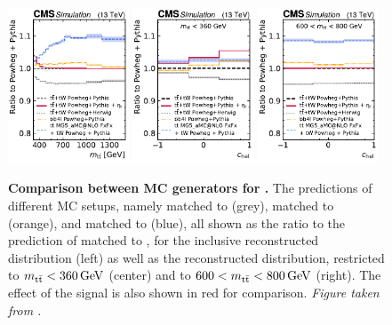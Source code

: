 \begin{figure}[!t]
    \centering
    \includegraphics[width=0.32\textwidth]{figures/ah/altbgs/generators_mtt_cms.pdf}
    \hfill
    \includegraphics[width=0.32\textwidth]{figures/ah/altbgs/generators_chel_lowmtt_cms.pdf}
    \hfill
    \includegraphics[width=0.32\textwidth]{figures/ah/altbgs/generators_chel_highmtt_cms.pdf}
    \caption{
        \textbf{Comparison between MC generators for \tttWsum.} The predictions of different MC setups, namely \powheg \tttWsum matched to \herwig (grey), \bbfourl matched to \pythia (orange), and \amcatnlo matched to \pythia (blue), all shown as the ratio to the prediction of \powheg \tttWsum matched to \pythia, for the inclusive reconstructed \mtt distribution (left) as well as the reconstructed \chel distribution, restricted to $\mtt < \SI{360}{\GeV}$ (center) and to $600 < \mtt < \SI{800}{\GeV}$ (right). The effect of the \etat signal is also shown in red for comparison. \textit{Figure taken from .}
    }
    \label{fig:ah:herwigbb4l}
\end{figure}

